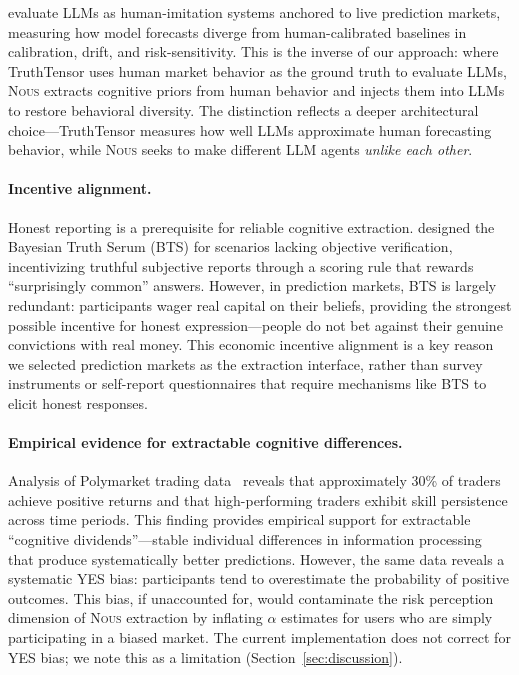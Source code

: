 \documentclass[11pt]{article}
\newcommand{\nous}{\textsc{Nous}}
\begin{document}
\citet{shahabi2026truthtensor} evaluate LLMs as human-imitation systems anchored to live prediction markets, measuring how model forecasts diverge from human-calibrated baselines in calibration, drift, and risk-sensitivity. This is the inverse of our approach: where TruthTensor uses human market behavior as the ground truth to evaluate LLMs, \nous{} extracts cognitive priors from human behavior and injects them into LLMs to restore behavioral diversity. The distinction reflects a deeper architectural choice---TruthTensor measures how well LLMs approximate human forecasting behavior, while \nous{} seeks to make different LLM agents \emph{unlike each other}.

\paragraph{Incentive alignment.}
Honest reporting is a prerequisite for reliable cognitive extraction. \citet{prelec2004bayesian} designed the Bayesian Truth Serum (BTS) for scenarios lacking objective verification, incentivizing truthful subjective reports through a scoring rule that rewards ``surprisingly common'' answers. However, in prediction markets, BTS is largely redundant: participants wager real capital on their beliefs, providing the strongest possible incentive for honest expression---people do not bet against their genuine convictions with real money. This economic incentive alignment is a key reason we selected prediction markets as the extraction interface, rather than survey instruments or self-report questionnaires that require mechanisms like BTS to elicit honest responses.

\paragraph{Empirical evidence for extractable cognitive differences.}
Analysis of Polymarket trading data~\citep{reichenbach2025polymarket} reveals that approximately 30\% of traders achieve positive returns and that high-performing traders exhibit skill persistence across time periods. This finding provides empirical support for extractable ``cognitive dividends''---stable individual differences in information processing that produce systematically better predictions. However, the same data reveals a systematic YES bias: participants tend to overestimate the probability of positive outcomes. This bias, if unaccounted for, would contaminate the risk perception dimension of \nous{} extraction by inflating $\alpha$ estimates for users who are simply participating in a biased market. The current implementation does not correct for YES bias; we note this as a limitation (Section~\ref{sec:discussion}).
\end{document}
